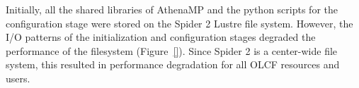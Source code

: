 

Initially, all the shared libraries of AthenaMP and the python scripts for the
configuration stage were stored on the Spider 2 Lustre file system. However, the
I/O patterns of the initialization and configuration stages degraded the
performance of the filesystem (Figure~\ref{}). Since Spider 2 is a
center-wide file system, this resulted in  performance degradation for all OLCF
resources and users. 

